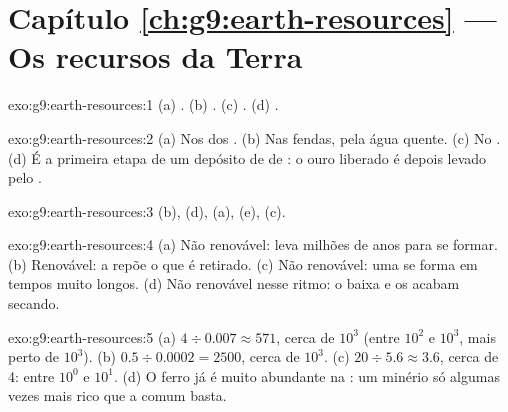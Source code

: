 \section*{Capítulo \ref{ch:g9:earth-resources} --- Os recursos da Terra}

\begin{solution}{exo:g9:earth-resources:1}
(a) . (b) . (c) . (d) .
\end{solution}

\begin{solution}{exo:g9:earth-resources:2}
(a) Nos  dos . (b) Nas fendas, pela água quente. (c) No
. (d) É a primeira etapa de um depósito de  de : o ouro
liberado é depois levado pelo .
\end{solution}

\begin{solution}{exo:g9:earth-resources:3}
(b), (d), (a), (e), (c).
\end{solution}

\begin{solution}{exo:g9:earth-resources:4}
(a) Não renovável: leva milhões de anos para se formar. (b) Renovável: a
 repõe o que é retirado. (c) Não renovável: uma  se forma em
tempos muito longos. (d) Não renovável nesse ritmo: o 
baixa e os  acabam secando.
\end{solution}

\begin{solution}{exo:g9:earth-resources:5}
(a) $4 \div 0.007 \approx 571$, cerca de $10^3$ (entre $10^2$ e $10^3$,
mais perto de $10^3$). (b) $0.5 \div 0.0002 = 2500$, cerca de $10^3$.
(c) $20
\div 5.6 \approx 3.6$, cerca de 4: entre $10^0$ e $10^1$.
(d) O ferro já é muito abundante na : um minério só algumas vezes
mais rico que a  comum basta.
\end{solution}

